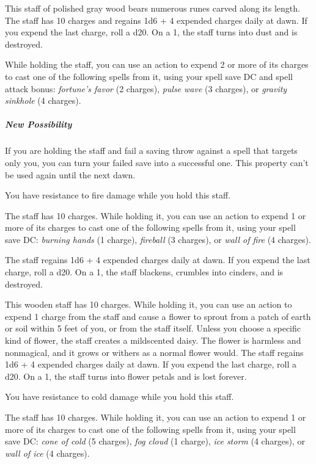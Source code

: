 \documentclass[10pt,a4paper,twoside,bg=print,twocolumn,openany,nodeprecatedcode]{dndbook}
\begin{document}
This staff of polished gray wood bears numerous runes carved along its length. The staff has 10 charges and regains 1d6 + 4 expended charges daily at dawn. If you expend the last charge, roll a d20. On a 1, the staff turns into dust and is destroyed.

While holding the staff, you can use an action to expend 2 or more of its charges to cast one of the following spells from it, using your spell save DC and spell attack bonus: \textit{fortune's favor} (2 charges), \textit{pulse wave} (3 charges), or \textit{gravity sinkhole} (4 charges).

\subparagraph{New Possibility}
If you are holding the staff and fail a saving throw against a spell that targets only you, you can turn your failed save into a successful one. This property can't be used again until the next dawn.

You have resistance to fire damage while you hold this staff.

The staff has 10 charges. While holding it, you can use an action to expend 1 or more of its charges to cast one of the following spells from it, using your spell save DC: \textit{burning hands} (1 charge), \textit{fireball} (3 charges), or \textit{wall of fire} (4 charges).

The staff regains 1d6 + 4 expended charges daily at dawn. If you expend the last charge, roll a d20. On a 1, the staff blackens, crumbles into cinders, and is destroyed.

This wooden staff has 10 charges. While holding it, you can use an action to expend 1 charge from the staff and cause a flower to sprout from a patch of earth or soil within 5 feet of you, or from the staff itself. Unless you choose a specific kind of flower, the staff creates a mildscented daisy. The flower is harmless and nonmagical, and it grows or withers as a normal flower would. The staff regains 1d6 + 4 expended charges daily at dawn. If you expend the last charge, roll a d20. On a 1, the staff turns into flower petals and is lost forever.

You have resistance to cold damage while you hold this staff.

The staff has 10 charges. While holding it, you can use an action to expend 1 or more of its charges to cast one of the following spells from it, using your spell save DC: \textit{cone of cold} (5 charges), \textit{fog cloud} (1 charge), \textit{ice storm} (4 charges), or \textit{wall of ice} (4 charges).
\end{document}
